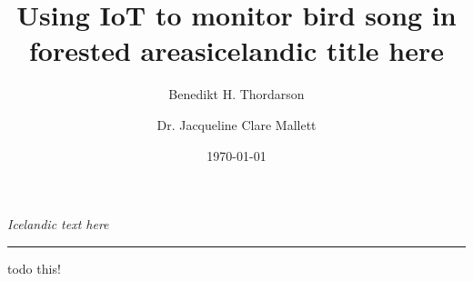 \documentclass[11pt]{article} %
\title{Using IoT to monitor bird song in forested areas}
\title{icelandic title here}
\date{\today}
\author{Benedikt H. Thordarson \and Dr. Jacqueline Clare Mallett }
\newif\ifenglish
\begin{document}

\maketitle %

\begin{center}
    \ifenglish
        \textit{A proposal to use narrowband IoT to observe and 
        analyze the bird song dwelling birds.} \\
    \else
        \textit{Icelandic text here} 
    \fi
\end{center}
\noindent\rule{\linewidth}{\arrayrulewidth}

    \ifenglish     
        
    \else
        todo this!
    \fi

{}

\end{document}
